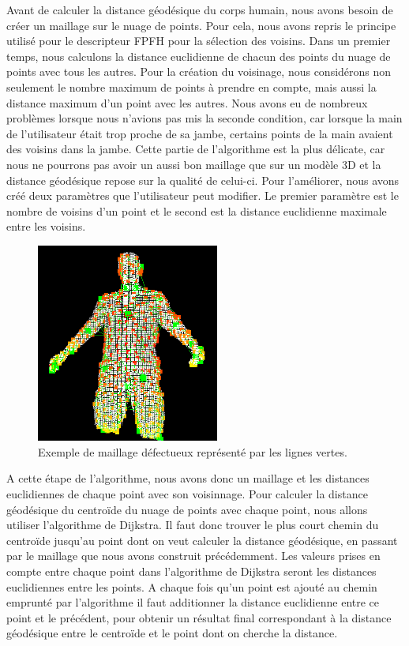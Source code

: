 Avant de calculer la distance géodésique du corps humain, nous avons besoin de créer un maillage sur le nuage de points. Pour cela,
nous avons repris le principe utilisé pour le descripteur FPFH\cite{FPFH} pour la sélection des voisins. Dans un premier temps, nous calculons
la distance euclidienne de chacun des points du nuage de points avec tous les autres. Pour la création du voisinage, nous considérons non
seulement le nombre maximum de points à prendre en compte, mais aussi la distance maximum d'un point avec les autres. Nous avons eu
de nombreux problèmes lorsque nous n'avions pas mis la seconde condition, car lorsque la main de l'utilisateur était trop proche de sa 
jambe, certains points de la main avaient des voisins dans la jambe. Cette partie de l'algorithme est la plus délicate, car nous ne pourrons
pas avoir un aussi bon maillage que sur un modèle 3D et la distance géodésique repose sur la qualité de celui-ci. Pour l'améliorer, nous avons créé deux paramètres que l'utilisateur peut modifier. Le premier paramètre est le nombre de voisins d'un point et
le second est la distance euclidienne maximale entre les voisins.\\

\begin{figure}[!ht]
  \begin{center}
    \includegraphics[width=6cm]{image/maillage.PNG}
    \caption{Exemple de maillage défectueux représenté par les lignes vertes.}
    \label{fig:seuillage}
  \end{center}
\end{figure}

A cette étape de l'algorithme, nous avons donc un maillage et les distances euclidiennes de chaque point avec son voisinnage. Pour calculer
la distance géodésique du centroïde du nuage de points avec chaque point, nous allons utiliser l'algorithme de Dijkstra\cite{dijkstra}.
Il faut donc trouver le plus court chemin du centroïde jusqu'au point dont on veut calculer la distance géodésique, en passant par le
maillage que nous avons construit précédemment. Les valeurs prises en compte entre chaque point dans l'algorithme de Dijkstra seront
les distances euclidiennes entre les points. A chaque fois qu'un point est ajouté au chemin emprunté par l'algorithme il faut 
additionner la distance euclidienne entre ce point et le précédent, pour obtenir un résultat final correspondant à la distance 
géodésique entre le centroïde et le point dont on cherche la distance.\\

